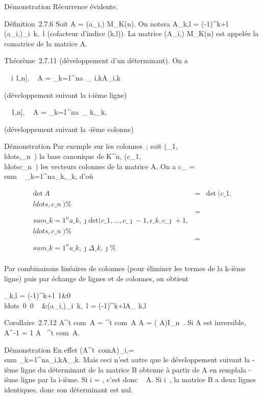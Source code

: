 \documentclass[]{article}
\begin{document}
Démonstration Récurrence évidente.

Définition~2.7.6 Soit A = (a\_i,\jmath) \in M\_K(n). On notera
A\_k,l = (-1)^k+l\
(a\_i,\jmath)\_i\neq~k,\jmath\mathrel\neq~l
(cofacteur d'indice (k,l)). La matrice (A\_i,\jmath) \in
M\_K(n) est appelée la comatrice de la matrice A.

Théorème~2.7.11 (développement d'un déterminant). On a

\forall~~i \in {[}1,n{]},\quad
{}~ A =
\sum \_k=1^na~\_
i,kA\_i,k

(développement suivant la i-ième ligne)

\forall~~\jmath \in {[}1,n{]},\quad
{}~ A =
\sum \_k=1^na~\_
k,\jmathA\_k,\jmath

(développement suivant la \jmath-ième colonne)

Démonstration Par exemple sur les colonnes~; soit
(\epsilon\_1,\\ldots,\epsilon\_n~)
la base canonique de K^n,
(c\_1,\\ldotsc\_n~)
les vecteurs colonnes de la matrice A. On a c\_\jmath
= \\sum ~
\_k=1^na\_k,\jmath\epsilon\_k, d'où

\begin{align*}
\mathrm{det}~ A& =&
\mathrm{det}~
(c\_1,\\ldots,c\_n~)
\%& \\ & =& \\sum
\_k=1^na\_ k,\jmath \mathrm{det}
(c\_1,\ldots,c\_\jmath-1,\epsilon\_k,c\_\jmath+1,\\ldots,c\_n~)\%&
\\ & =& \\sum
\_k=1^na\_ k,\jmath\Delta\_k,\jmath \%&
\\ \end{align*}

Par combinaisons linéaires de colonnes (pour éliminer les termes de la
k-ième ligne) puis par échange de lignes et de colonnes, on obtient

\Delta\_k,l = (-1)^k+l\left
\textbar{}\matrix\,1&0\\ldots~0
\cr \matrix\,0
\cr \⋮~
&(a\_i,\jmath)\_i\neq~k,\jmath\mathrel\neq~l\right
\textbar{} = (-1)^k+lA\_ k,l

Corollaire~2.7.12 A^t com~A =
^t com~A A =
( A)I\_n~.
Si A est inversible, A^-1 = 1 \over
\mathrm{det} A~
^t com~A.

Démonstration En effet (A^t\
comA)\_i,\jmath =\ \\sum
 \_k=1^na\_i,kA\_\jmath,k. Mais ceci n'est
autre que le développement suivant la \jmath-ième ligne du déterminant de la
matrice B obtenue à partir de A en rempla\ccant la
\jmath-ième ligne par la i-ième. Si i = \jmath, c'est donc
\mathrm{det}~ A. Si
i\neq~\jmath, la matrice B a deux lignes identiques,
donc son déterminant est nul.
\end{document}
